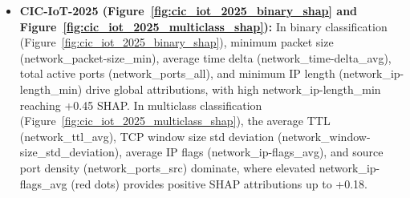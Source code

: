 \documentclass[a4paper,fleqn]{cas-sc}
\begin{document}
\begin{itemize}
    \item \textbf{CIC-IoT-2025 (Figure~\ref{fig:cic_iot_2025_binary_shap} and Figure~\ref{fig:cic_iot_2025_multiclass_shap}):} In binary classification (Figure~\ref{fig:cic_iot_2025_binary_shap}), minimum packet size (network\_packet-size\_min), average time delta (network\_time-delta\_avg), total active ports (network\_ports\_all), and minimum IP length (network\_ip-length\_min) drive global attributions, with high network\_ip-length\_min reaching +0.45 SHAP. In multiclass classification (Figure~\ref{fig:cic_iot_2025_multiclass_shap}), the average TTL (network\_ttl\_avg), TCP window size std deviation (network\_window-size\_std\_deviation), average IP flags (network\_ip-flags\_avg), and source port density (network\_ports\_src) dominate, where elevated network\_ip-flags\_avg (red dots) provides positive SHAP attributions up to +0.18.
\end{itemize}
\end{document}
